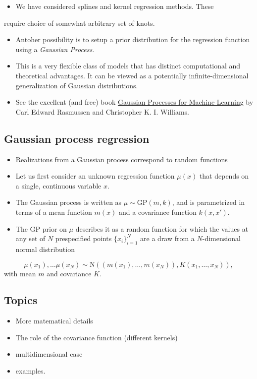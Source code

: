 \documentclass[%
oneside,                 %
final,                   %
10pt]{article}
\begin{document}
\begin{itemize}
\item We have considered splines and kernel regression methods. These
\end{itemize}

\noindent
require choice of somewhat arbitrary set of knots.

\begin{itemize}
\item Antoher possibility is to setup a prior distribution for the
  regression function using a \emph{Gaussian Process}.

\item This is a very flexible class of models that has distinct computational
  and theoretical advantages. It can be viewed as a potentially
  infinite-dimensional generalization of Gaussian distributions.

\item See the excellent (and free) book \href{{http://www.gaussianprocess.org/gpml/}}{Gaussian Processes for Machine
  Learning} by Carl Edward
  Rasmussen and Christopher K. I. Williams. 
\end{itemize}

\noindent
\subsection*{Gaussian process regression}

\begin{itemize}
\item Realizations from a Gaussian process correspond to random functions

\item Let us first consider an unknown regression function $\mu(x)$ that
  depends on a single, continuous variable $x$.

\item The Gaussian process is written as $\mu \sim \mathrm{GP}(m,k)$, and
  is parametrized in terms of a mean function $m(x)$ and a covariance
  function $k(x,x')$.

\item The GP prior on $\mu$ describes it as a random function for which
  the values at any set of $N$ prespecified points $\{x_i\}_{i=1}^N$
  are a draw from a $N$-dimensional normal distribution
\end{itemize}

\noindent
$$
  \mu(x_1), \ldots \mu(x_N) \sim \mathrm{N}\left( \left( m(x_1),
  \ldots, m(x_N) \right), K(x_1, \ldots, x_N) \right),
$$
  with mean $m$ and covariance $K$.

\subsection*{Topics}
\begin{itemize}
\item More matematical details

\item The role of the covariance function (different kernels)

\item multidimensional case

\item examples.
\end{itemize}

\noindent

\end{document}
